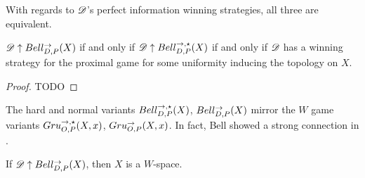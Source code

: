 With regards to $\mathscr{D}$'s perfect information winning strategies, all three
are equivalent.

\begin{thm}
  $\mathscr{D}\uparrow Bell_{D,P}^{\to}(X)$ if and only if $\mathscr{D}\uparrow Bell_{D,P}^{\to,\star}(X)$ if and
  only if $\mathscr{D}$ has a winning strategy for the proximal game for some
  uniformity inducing the topology on $X$.
\end{thm}

\begin{proof}
  TODO
\end{proof}

The hard and normal variants $Bell_{D,P}^{\to,\star}(X)$, $Bell_{D,P}^{\to}(X)$ mirror the
$W$ game variants $Gru_{O,P}^{\to,\star}(X,x)$, $Gru_{O,P}^{\to}(X,x)$. In fact, Bell
showed a strong connection in \cite{MR3239205}.

\begin{thm}
  If $\mathscr{D}\uparrow Bell_{D,P}^{\to}(X)$, then $X$ is a $W$-space.
\end{thm}



